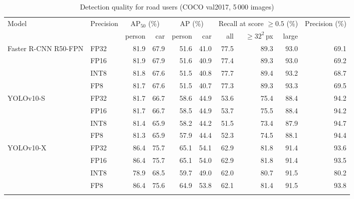 \documentclass[pdflatex,sn-mathphys-num]{sn-jnl}%
\theoremstyle{thmstyleone}%
\theoremstyle{thmstyletwo}%
\theoremstyle{thmstylethree}%
\begin{document}
\begin{appendices}
\begin{table}[htbp]
\footnotesize\setlength{\tabcolsep}{2.5pt}
\caption{Detection quality for road users (COCO val2017, 5\,000 images)}\label{tab:operating}
\begin{tabular}{@{}llrrrrrrrr@{}}
\toprule
Model & Precision & \multicolumn{2}{c}{AP$_{50}$ (\%)} & \multicolumn{2}{c}{AP (\%)} & \multicolumn{3}{c}{Recall at score $\geq0.5$ (\%)} & Precision (\%) \\
\cmidrule{3-4}\cmidrule{5-6}\cmidrule{7-9}
 & & person & car & person & car & all & $\geq32^2$\,px & large & \\
\midrule
Faster R-CNN R50-FPN & FP32 & 81.9 & 67.9 & 51.6 & 41.0 & 77.5 & 89.3 & 93.0 & 69.1 \\
 & FP16 & 81.9 & 67.9 & 51.6 & 40.9 & 77.4 & 89.3 & 93.0 & 69.2 \\
 & INT8 & 81.8 & 67.6 & 51.5 & 40.8 & 77.7 & 89.4 & 93.2 & 68.7 \\
 & FP8 & 81.7 & 67.6 & 51.5 & 40.7 & 77.3 & 89.3 & 93.3 & 69.5 \\
\midrule
YOLOv10-S & FP32 & 81.7 & 66.7 & 58.6 & 44.9 & 53.6 & 75.4 & 88.4 & 94.2 \\
 & FP16 & 81.7 & 66.7 & 58.5 & 44.9 & 53.7 & 75.5 & 88.4 & 94.2 \\
 & INT8 & 81.4 & 65.9 & 58.2 & 44.2 & 51.5 & 73.4 & 87.9 & 94.7 \\
 & FP8 & 81.3 & 65.9 & 57.9 & 44.4 & 52.3 & 74.5 & 88.1 & 94.4 \\
\midrule
YOLOv10-X & FP32 & 86.4 & 75.7 & 65.1 & 54.1 & 62.9 & 81.8 & 91.4 & 93.6 \\
 & FP16 & 86.4 & 75.7 & 65.1 & 54.0 & 62.9 & 81.8 & 91.4 & 93.5 \\
 & INT8 & 78.9 & 68.5 & 59.7 & 49.0 & 62.0 & 80.7 & 91.5 & 80.2 \\
 & FP8 & 86.4 & 75.6 & 64.9 & 53.8 & 62.1 & 81.4 & 91.5 & 93.8 \\
\botrule
\end{tabular}
\end{table}


\end{appendices}
\end{document}
